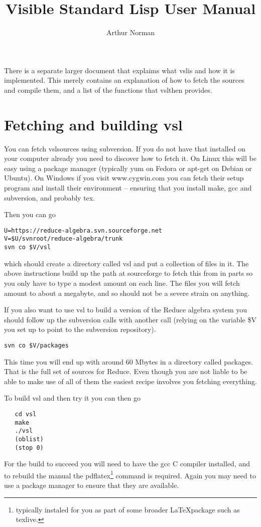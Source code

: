 \documentclass[a4paper,12pt]{article}
\title{Visible Standard Lisp User Manual}
\author{Arthur Norman}
\newcommand{\vsl}{{\ttfamily vsl}}
\newcommand{\tx}{\ttfamily}
\newcommand{\sverb}{\small\begin{verbatim}}
\begin{document}
\maketitle


There is a separate larger document that explaims what \vsl is
and how it is implemented. This merely contains an explanation of how
to fetch the sources and compile them, and a list of the functions
that \vsl then provides.


\section{Fetching and building vsl}
You can fetch \vsl sources using {\tx subversion}. If you do not have that
installed on your computer already you need to discover how to fetch it.
On Linux this will be easy using a package manager (typically {\tx yum}
on Fedora or {\tx apt-get} on Debian or Ubuntu). On Windows if you visit
{\tx www.cygwin.com} you can fetch their setup program and install their
environment -- ensuring that you install {\tx make}, {\tx gcc} and
{\tx subversion}, and probably {\tx tex}.

Then you can go
{\sverb
U=https://reduce-algebra.svn.sourceforge.net
V=$U/svnroot/reduce-algebra/trunk
svn co $V/vsl
\end{verbatim}}
which should create a directory called {\tx vsl} and put a collection of
files in it. The above instructions build up the path at {\tx sourceforge}
to fetch this from in parts so you only have to type a modest
amount on each line. The files you will fetch amount to about a megabyte,
and so should not be a severe strain on anything.

If you also want to use \vsl{} to build a version of the Reduce algebra
system you should follow up the subversion calls with another call (relying
on the variable {\tx \$V} you set up to point to the subversion repository).
{\sverb
svn co $V/packages
\end{verbatim}}
This time you will end up with around 60 Mbytes in a directory called
{\tx packages}. That is the full set of sources for Reduce. Even though you
are not liable to be able to make use of all of them the easiest recipe
involves you fetching everything.

To build \vsl{} and then try it you can then go
{\sverb
   cd vsl
   make
   ./vsl
   (oblist)
   (stop 0)
\end{verbatim}}

For the build to succeed you will need to have the {\tx gcc} C compiler
installed, and to rebuild the manual the {\tx pdflatex}\footnote{typically
instaled for you as part of some broader \LaTeX package such as texlive.}
command is required. Again you may need to use a package manager to ensure
that they are available.
\end{document}
